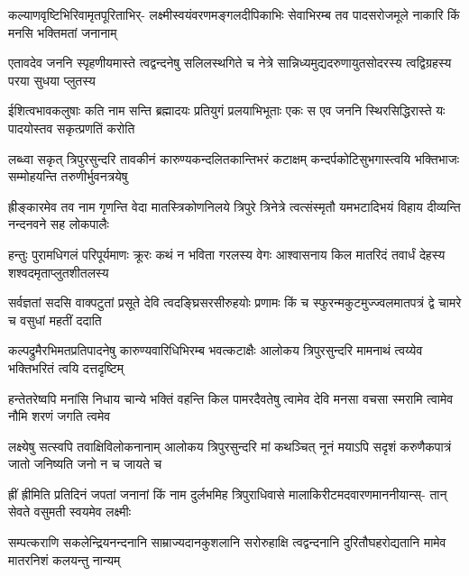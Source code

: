 
\fourlineindentedshloka
{कल्याणवृष्टिभिरिवामृतपूरिताभिर्-}
{लक्ष्मीस्वयंवरणमङ्गलदीपिकाभिः}
{सेवाभिरम्ब तव पादसरोजमूले}
{नाकारि किं मनसि भक्तिमतां जनानाम्}%

\fourlineindentedshloka
{एतावदेव जननि स्पृहणीयमास्ते}
{त्वद्वन्दनेषु सलिलस्थगिते च नेत्रे}
{सान्निध्यमुद्यदरुणायुतसोदरस्य}
{त्वद्विग्रहस्य परया सुधया प्लुतस्य}%

\fourlineindentedshloka
{ईशित्वभावकलुषाः कति नाम सन्ति}
{ब्रह्मादयः प्रतियुगं प्रलयाभिभूताः}
{एकः स एव जननि स्थिरसिद्धिरास्ते}
{यः पादयोस्तव सकृत्प्रणतिं करोति}%

\fourlineindentedshloka
{लब्ध्वा सकृत् त्रिपुरसुन्दरि तावकीनं}
{कारुण्यकन्दलितकान्तिभरं कटाक्षम्}
{कन्दर्पकोटिसुभगास्त्वयि भक्तिभाजः}
{सम्मोहयन्ति तरुणीर्भुवनत्रयेषु}%

\fourlineindentedshloka
{ह्रीङ्कारमेव तव नाम गृणन्ति वेदा}
{मातस्त्रिकोणनिलये त्रिपुरे त्रिनेत्रे}
{त्वत्संस्मृतौ यमभटादिभयं विहाय}
{दीव्यन्ति नन्दनवने सह लोकपालैः}%

\fourlineindentedshloka
{हन्तुः पुरामधिगलं परिपूर्यमाणः}
{क्रूरः कथं न भविता गरलस्य वेगः}
{आश्वासनाय किल मातरिदं तवार्धं}
{देहस्य शश्वदमृताप्लुतशीतलस्य}%

\fourlineindentedshloka
{सर्वज्ञतां सदसि वाक्पटुतां प्रसूते}
{देवि त्वदङ्घ्रिसरसीरुहयोः प्रणामः}
{किं च स्फुरन्मकुटमुज्ज्वलमातपत्रं}
{द्वे चामरे च वसुधां महतीं ददाति}%

\fourlineindentedshloka
{कल्पद्रुमैरभिमतप्रतिपादनेषु}
{कारुण्यवारिधिभिरम्ब भवत्कटाक्षैः}
{आलोकय त्रिपुरसुन्दरि मामनाथं}
{त्वय्येव भक्तिभरितं त्वयि दत्तदृष्टिम्}%

\fourlineindentedshloka
{हन्तेतरेष्वपि मनांसि निधाय चान्ये}
{भक्तिं वहन्ति किल पामरदैवतेषु}
{त्वामेव देवि मनसा वचसा स्मरामि}
{त्वामेव नौमि शरणं जगति त्वमेव}%

\fourlineindentedshloka
{लक्ष्येषु सत्स्वपि तवाक्षिविलोकनानाम्}
{आलोकय त्रिपुरसुन्दरि मां कथञ्चित्}
{नूनं मयाऽपि सदृशं करुणैकपात्रं}
{जातो जनिष्यति जनो न च जायते च}%

\fourlineindentedshloka
{ह्रीं ह्रीमिति प्रतिदिनं जपतां जनानां}
{किं नाम दुर्लभमिह त्रिपुराधिवासे}
{मालाकिरीटमदवारणमाननीयान्स्-}
{तान् सेवते वसुमती स्वयमेव लक्ष्मीः}%

\fourlineindentedshloka
{सम्पत्कराणि सकलेन्द्रियनन्दनानि}
{साम्राज्यदानकुशलानि सरोरुहाक्षि}
{त्वद्वन्दनानि दुरितौघहरोद्यतानि}
{मामेव मातरनिशं कलयन्तु नान्यम्}%

